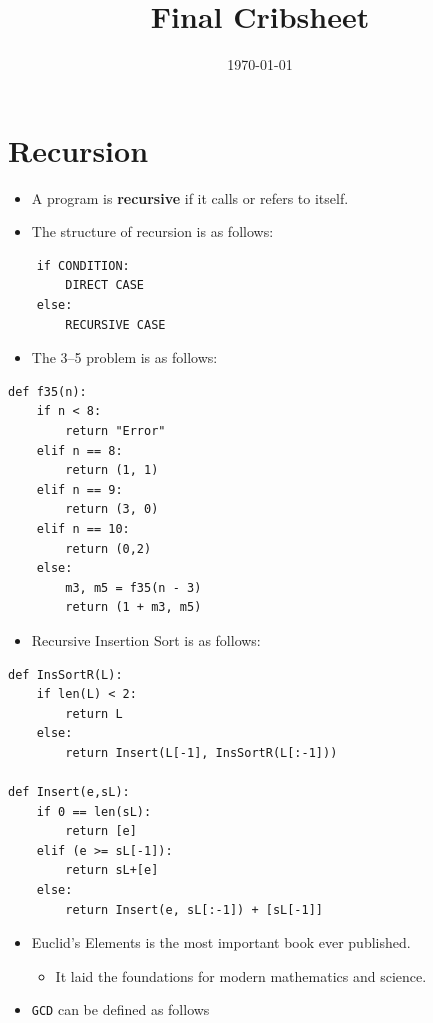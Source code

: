 \documentclass[12pt]{scrartcl}
\title{Final Cribsheet}
\date{\today}
\newcommand{\shellcmd}[1]{\texttt{#1}}
\begin{document}
\maketitle

\section{Recursion}
\begin{itemize}
    \item A program is \textbf{recursive} if it calls or refers to itself.

    \item The structure of recursion is as follows:
\end{itemize}

\begin{lstlisting}
    if CONDITION:
        DIRECT CASE
    else:
        RECURSIVE CASE
\end{lstlisting}

\begin{itemize}
    \item The 3--5 problem is as follows:
\end{itemize}

\begin{lstlisting}
def f35(n):
    if n < 8:
        return "Error"
    elif n == 8:
        return (1, 1)
    elif n == 9:
        return (3, 0)
    elif n == 10:
        return (0,2)
    else:
        m3, m5 = f35(n - 3)
        return (1 + m3, m5)
\end{lstlisting}

\begin{itemize}
    \item Recursive Insertion Sort is as follows:
\end{itemize}

\begin{lstlisting}
def InsSortR(L):
    if len(L) < 2:
        return L
    else:
        return Insert(L[-1], InsSortR(L[:-1]))

def Insert(e,sL):
    if 0 == len(sL):
        return [e]
    elif (e >= sL[-1]):
        return sL+[e]
    else:
        return Insert(e, sL[:-1]) + [sL[-1]]
\end{lstlisting}

\begin{itemize}
    \item Euclid's Elements is the most important book ever published.
        \begin{itemize}
            \item It laid the foundations for modern mathematics and science.
        \end{itemize}

    \item \shellcmd{GCD} can be defined as follows
\end{itemize}
\end{document}
